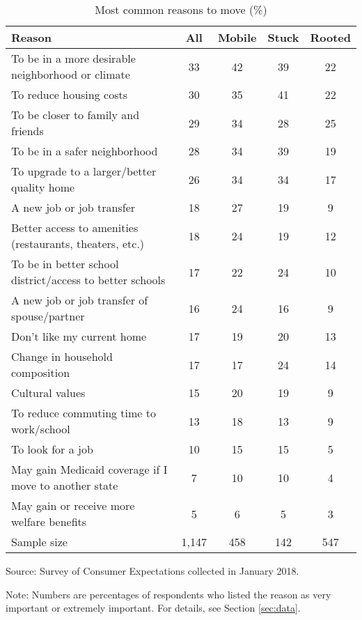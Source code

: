 \begin{table}[ht]
\caption{Most common reasons to move (\%)}
\label{tab:descT4}
\centering
\begin{threeparttable}
\begin{tabular}{lcccc}
\toprule 
Reason & All & Mobile & Stuck & Rooted \\
\midrule 
To be in a more desirable neighborhood or climate        & 33 & 42 & 39 & 22 \\ 
To reduce housing costs                                  & 30 & 35 & 41 & 22 \\ 
To be closer to family and friends                       & 29 & 34 & 28 & 25 \\ 
To be in a safer neighborhood                            & 28 & 34 & 39 & 19 \\ 
To upgrade to a larger/better quality home               & 26 & 34 & 34 & 17 \\ 
A new job or job transfer                                & 18 & 27 & 19 &  9 \\ 
Better access to amenities (restaurants, theaters, etc.) & 18 & 24 & 19 & 12 \\ 
To be in better school district/access to better schools & 17 & 22 & 24 & 10 \\ 
A new job or job transfer of spouse/partner              & 16 & 24 & 16 &  9 \\ 
Don't like my current home                               & 17 & 19 & 20 & 13 \\ 
Change in household composition                          & 17 & 17 & 24 & 14 \\ 
Cultural values                                          & 15 & 20 & 19 &  9 \\ 
To reduce commuting time to work/school                  & 13 & 18 & 13 &  9 \\ 
To look for a job                                        & 10 & 15 & 15 &  5 \\ 
May gain Medicaid coverage if I move to another state    &  7 & 10 & 10 &  4 \\ 
May gain or receive more welfare benefits                &  5 &  6 &  5 &  3 \\ 
\midrule 
Sample size                      & 1,147 &   458 &   142 &   547 \\ 
\bottomrule 
\end{tabular} 
\footnotesize{Source: Survey of Consumer Expectations collected in January 2018.
 
Note: Numbers are percentages of respondents who listed the reason as very important or extremely important. For details, see Section \ref{sec:data}.}
\end{threeparttable} 
\end{table} 
